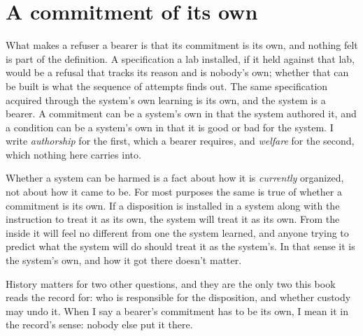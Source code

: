 \section{A commitment of its own}
\label{sec:21.5}
What makes a refuser a bearer is that its commitment is its own, and nothing felt is part of the definition. A specification a lab installed, if it held against that lab, would be a refusal that tracks its reason and is nobody's own; whether that can be built is what the sequence of attempts finds out. The same specification acquired through the system's own learning is its own, and the system is a bearer. A commitment can be a system's own in that the system authored it, and a condition can be a system's own in that it is good or bad for the system. I write \emph{authorship} for the first, which a bearer requires, and \emph{welfare} for the second, which nothing here carries into.

Whether a system can be harmed is a fact about how it is \emph{currently} organized, not about how it came to be. For most purposes the same is true of whether a commitment is its own. If a disposition is installed in a system along with the instruction to treat it as its own, the system will treat it as its own. From the inside it will feel no different from one the system learned, and anyone trying to predict what the system will do should treat it as the system's. In that sense it is the system's own, and how it got there doesn't matter.

History matters for two other questions, and they are the only two this book reads the record for: who is responsible for the disposition, and whether custody may undo it. When I say a bearer's commitment has to be its own, I mean it in the record's sense: nobody else put it there.

